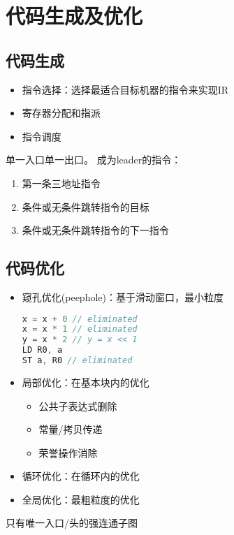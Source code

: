 
\section{代码生成及优化}
\subsection{代码生成}
\begin{itemize}
	\item 指令选择：选择最适合目标机器的指令来实现IR
	\item 寄存器分配和指派
	\item 指令调度
\end{itemize}

\begin{definition}
单一入口单一出口。
成为leader的指令：
\begin{enumerate}
	\item 第一条三地址指令
	\item 条件或无条件跳转指令的目标
	\item 条件或无条件跳转指令的下一指令
\end{enumerate}
\end{definition}

\subsection{代码优化}
\begin{itemize}
	\item 窥孔优化(peephole)：基于滑动窗口，最小粒度
\begin{lstlisting}[language=c++]
x = x + 0 // eliminated
x = x * 1 // eliminated
y = x * 2 // y = x << 1
LD R0, a
ST a, R0 // eliminated
\end{lstlisting}
	\item 局部优化：在基本块内的优化
\begin{itemize}
	\item 公共子表达式删除
	\item 常量/拷贝传递
	\item 荣誉操作消除
\end{itemize}
	\item 循环优化：在循环内的优化
	\item 全局优化：最粗粒度的优化
\end{itemize}

\begin{definition}[循环(loop)]
只有唯一入口/头的强连通子图
\end{definition}